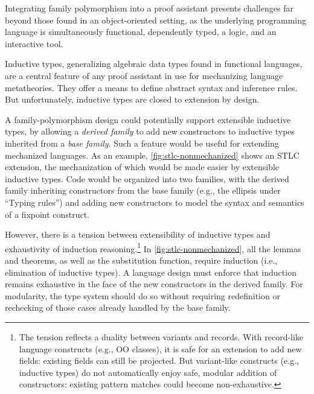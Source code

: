 Integrating family polymorphism into a proof assistant presents challenges
far beyond those found in an object-oriented setting, %
as the underlying programming language is simultaneously
functional, dependently typed, a logic, and an interactive tool.


Inductive types, generalizing algebraic data types found in
functional languages, are a central feature of any proof assistant
in use for mechanizing language metatheories.
They offer a means to define abstract syntax and inference rules.
But unfortunately, inductive types are closed to extension by design.

A family-polymorphism design could potentially support extensible
inductive types, by allowing a \emph{derived family} to add new constructors
to inductive types inherited from a \emph{base family}.
Such a feature would be useful for extending mechanized languages.
As an example, \cref{fig:stlc-nonmechanized} shows an STLC extension,
the mechanization of which would be made easier by extensible inductive types.
Code would be organized into two families, with the
derived family inheriting constructors from the base family (e.g., the
ellipsis under ``Typing rules'') and adding new constructors to model
the syntax and semantics of a fixpoint construct.



However, there is a tension between extensibility of inductive types
and exhaustivity of induction reasoning.\footnote{%
The tension reflects a duality between variants and records.
With record-like language constructs (e.g., OO classes),
it is safe for an extension to add new fields:
existing fields can still be projected.
But variant-like constructs (e.g., inductive types) do not automatically
enjoy safe, modular addition of constructors:
existing pattern matches could become non-exhaustive.}
In \cref{fig:stlc-nonmechanized}, all the lemmas and theorems, as well as
the substitution function, require induction (i.e., elimination of inductive types).
A language design must enforce that induction remains exhaustive in the
face of the new constructors in the derived family.
For modularity, the type system should do so without requiring
redefinition or rechecking of those cases already handled by the base
family.


